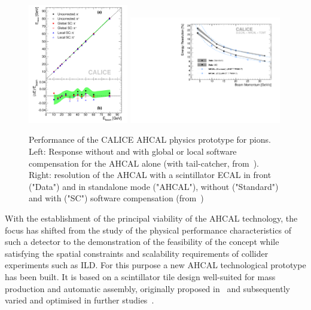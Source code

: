 \begin{figure}[hbt]
\centering
\includegraphics[width=0.39\textwidth]{Detector/fig/AHCAL-Linearity_Ini_GC_LC.pdf}
\includegraphics[width=0.59\textwidth]{Detector/fig/AHCALpion_resolution_data_ahcaljinst.pdf}
\caption{Performance of the CALICE AHCAL physics prototype for pions. Left: Response without and with global or local software compensation for the AHCAL alone (with tail-catcher, from~\cite{Adloff:2012gv}). Right: resolution of the AHCAL with a scintillator ECAL in front ("Data") and in standalone mode ("AHCAL"), without ("Standard") and with ("SC") software compensation (from~\cite{Repond:2018flg})}
\label{fig:ahcal-linres}
\end{figure}

With the establishment of the principal viability of the AHCAL technology, the focus has shifted from the study of the physical performance characteristics of such a detector to the demonstration of the feasibility of the concept while satisfying the spatial constraints and scalability requirements of collider experiments such as ILD. For this purpose a new AHCAL technological prototype has been built. It is based on a scintillator tile design well-suited for mass production and automatic assembly, originally proposed in~\cite{Blazey:2009zz} and subsequently varied and optimised in further studies~\cite{Simon:2010hf, Liu:2015cpe}. 

